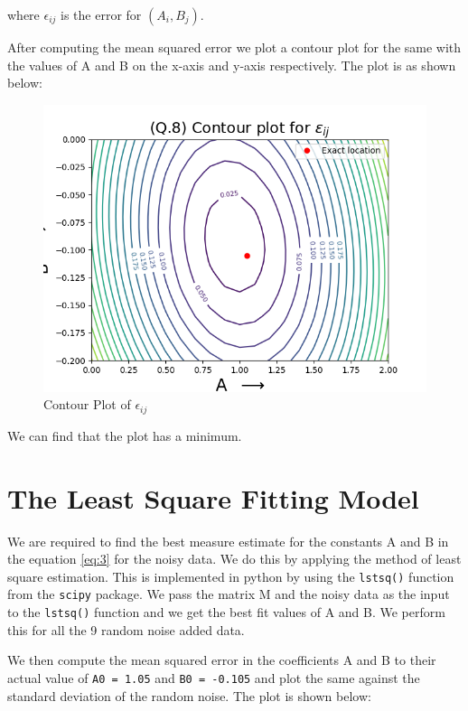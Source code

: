 \documentclass[11pt, a4paper]{article}
\begin{document}
where $\epsilon_{ij}$ is the error for $(A_i,B_j)$.

After computing the mean squared error we plot a contour plot for the same with the values of A and B on the x-axis and y-axis respectively. The plot is as shown below:

\begin{figure}[!tbh]
   	\centering
   	\includegraphics[scale=0.8]{q8.png}  
   	\caption{Contour Plot of $\epsilon_{ij}$}
   	\label{fig:fig3}
   \end{figure} 
   
  We can find that the plot has a minimum.  
\section{The Least Square Fitting Model}

We are required to find the best measure estimate for the constants A and B in the equation \eqref{eq:3} for the noisy data. We do this by applying the method of least square estimation. This is implemented in python by using the \texttt{lstsq()} function from the \texttt{scipy} package. We pass the matrix M and the noisy data as the input to the \texttt{lstsq()} function and we get the best fit values of A and B. We perform this for all the 9 random noise added data.
\newline

We then compute the mean squared error in the coefficients A and B to their actual value of \texttt{A0 = 1.05} and \texttt{B0 = -0.105} and plot the same  against the standard deviation of the random noise. The plot is shown below:
\end{document}
